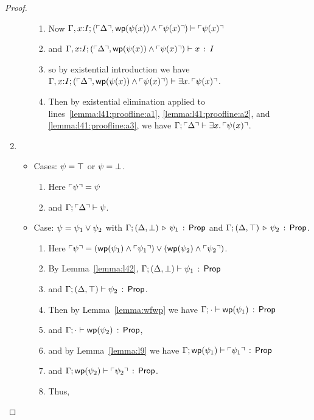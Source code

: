 \documentclass[10pt,a4paper]{article}
\begin{document}
\begin{proof}
\begin{enumerate}
\begin{itemize}
\begin{enumerate}
     \item 
       Now 
       $\Gamma,x{:}I;(\ulcorner \Delta \urcorner,\mathop{\mathsf{wp}}(\psi(x)) \wedge \ulcorner \psi(x) \urcorner) \vdash \ulcorner \psi(x) \urcorner$
     \item
       and
       $\Gamma,x{:}I;(\ulcorner \Delta \urcorner,\mathop{\mathsf{wp}}(\psi(x)) \wedge \ulcorner \psi(x) \urcorner) \vdash x\, :\, I$
     \item 
       \label{lemma:l41:proofline:a3}
       so by existential introduction we have 
       $\Gamma,x{:}I;(\ulcorner \Delta \urcorner,\mathop{\mathsf{wp}}(\psi(x)) \wedge \ulcorner \psi(x) \urcorner) \vdash \exists x.\, \ulcorner \psi(x) \urcorner$.
     \item
       Then by existential elimination 
       applied to lines~\ref{lemma:l41:proofline:a1}, \ref{lemma:l41:proofline:a2}, and \ref{lemma:l41:proofline:a3}, 
       we have
       $\Gamma;\ulcorner \Delta \urcorner \vdash \exists x.\, \ulcorner \psi(x) \urcorner$.
     \end{enumerate}
  \end{itemize}
\item %
  \begin{itemize}
  \item Cases: $\psi = \top$ or $\psi = \bot$.
    \begin{enumerate}
    \item 
      Here $\ulcorner \psi \urcorner = \psi$ 
    \item
      and $\Gamma;\ulcorner \Delta \urcorner \vdash \psi$.
    \end{enumerate}
  \item Case: $\psi = \psi_1 \vee \psi_2$ with
    $\Gamma;(\Delta,\bot) \,\triangleright\, \psi_1\,:\, \mathsf{Prop}$ and
    $\Gamma;(\Delta,\top) \,\triangleright\, \psi_2\,:\, \mathsf{Prop}$.
    \begin{enumerate}
    \item 
      Here $\ulcorner \psi \urcorner = 
      (\mathop{\mathsf{wp}}(\psi_1) \wedge \ulcorner \psi_1 \urcorner) \vee (\mathop{\mathsf{wp}}(\psi_2) \wedge \ulcorner \psi_2 \urcorner)$.
    \item 
      By Lemma~\ref{lemma:l42},
      $\Gamma;(\Delta,\bot) \vdash \psi_1\, :\, \mathsf{Prop}$ 
    \item 
      and
      $\Gamma;(\Delta,\top) \vdash \psi_2\, :\, \mathsf{Prop}$.
    \item
      Then by Lemma~\ref{lemma:wfwp} we have
      $\Gamma;\cdot \vdash \mathop{\mathsf{wp}}(\psi_1)\, :\, \mathsf{Prop}$
    \item 
      and 
      $\Gamma;\cdot \vdash \mathop{\mathsf{wp}}(\psi_2)\, :\, \mathsf{Prop}$,
    \item 
      and by Lemma~\ref{lemma:l9} we have
      $\Gamma;\mathop{\mathsf{wp}}(\psi_1) \vdash \ulcorner \psi_1 \urcorner\, :\, \mathsf{Prop}$
    \item 
      and
      $\Gamma;\mathop{\mathsf{wp}}(\psi_2) \vdash \ulcorner \psi_2 \urcorner\, :\, \mathsf{Prop}$.
    \item 
      Thus,

\end{enumerate}
\end{itemize}
\end{enumerate}
\end{proof}
\end{document}
